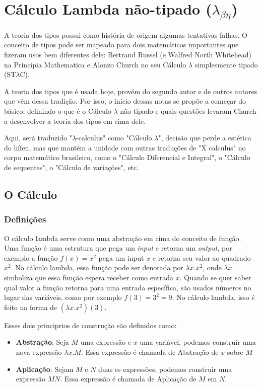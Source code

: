 \documentclass[../main.tex]{subfiles}
\begin{document}
\section[Cálculo Lambda não-tipado]{Cálculo Lambda não-tipado ($\lambda_{\beta\eta}$)}

A teoria dos tipos possui como história de origem algumas tentativas falhas. O conceito de tipos pode ser mapeado para dois matemáticos importantes que fizeram usos bem diferentes dele: Bertrand Russel (e Walfred North Whitehead) na Principia Mathematica e Alonzo Church no seu Cálculo $\lambda$ simplesmente tipado (ST$\lambda$C).

A teoria dos tipos que é usada hoje, provém do segundo autor e de outros autores que vêm dessa tradição. Por isso, o início dessas notas se propõe a começar do básico, definindo o que é o Cálculo $\lambda$ não tipado e quais questões levaram Church a desenvolver a teoria dos tipos em cima dele.

Aqui, será traduzido "$\lambda$-calculus" como "Cálculo $\lambda$", decisão que perde a estética do hífen, mas que mantém a unidade com outras traduções de  "X calculus" no corpo matemático brasileiro, como o "Cálculo Diferencial e Integral", o "Cálculo de sequentes", o "Cálculo de variações", etc.

\subsection{O Cálculo}

\subsubsection{Definições}

O cálculo lambda serve como uma abstração em cima do conceito de função. Uma função é uma estrutura que pega um \emph{input} e retorna um \emph{output}, por exemplo a função $f(x) = x^2$ pega um input $x$ e retorna seu valor ao quadrado $x^2$. No cálculo lambda, essa função pode ser denotada por $\lambda x. x^2$, onde $\lambda x .$ simboliza que essa função espera receber como entrada $x$. Quando se quer saber qual valor a função retorna para uma entrada específica, são usados números no lugar das variáveis, como por exemplo $f(3) = 3^2 = 9$. No cálculo lambda, isso é feito na forma de $(\lambda x. x^2)(3)$. 

Esses dois principrios de construção são definidos como:
\begin{itemize}
    \item \textbf{Abstração}: Seja $M$ uma expressão e $x$ uma variável, podemos construir uma nova expressão $\lambda x . M$. Essa expressão é chamada de Abstração de $x$ sobre $M$
    \item \textbf{Aplicação}: Sejam $M$ e $N$ duas es expressões, podemos construir uma expressão $M N$. Essa expressão é chamada de Aplicação de $M$ em $N$.
\end{itemize}
\end{document}
